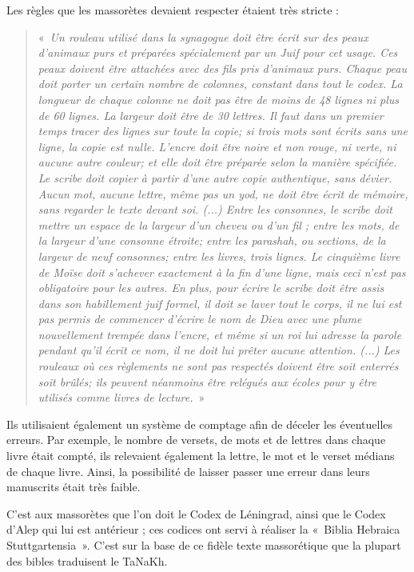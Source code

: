 \begin{small}
Les règles que les massorètes devaient respecter étaient très stricte :

\begin{quote}
«~\emph{Un rouleau utilisé dans la synagogue doit être écrit sur des peaux d’animaux purs et préparées spécialement par un Juif pour cet usage. Ces peaux doivent être attachées avec des fils pris d’animaux purs. Chaque peau doit porter un certain nombre de colonnes, constant dans tout le codex. La longueur de chaque colonne ne doit pas être de moins de 48 lignes ni plus de 60 lignes. La largeur doit être de 30 lettres. Il faut dans un premier temps tracer des lignes sur toute la copie; si trois mots sont écrits sans une ligne, la copie est nulle. L’encre doit être noire et non rouge, ni verte, ni aucune autre couleur; et elle doit être préparée selon la manière spécifiée. Le scribe doit copier à partir d’une autre copie authentique, sans dévier. Aucun mot, aucune lettre, même pas un yod, ne doit être écrit de mémoire, sans regarder le texte devant soi. (...) Entre les consonnes, le scribe doit mettre un espace de la largeur d’un cheveu ou d’un fil ; entre les mots, de la largeur d’une consonne étroite; entre les parashah, ou sections, de la largeur de neuf consonnes; entre les livres, trois lignes. Le cinquième livre de Moïse doit s’achever exactement à la fin d’une ligne, mais ceci n’est pas obligatoire pour les autres. En plus, pour écrire le scribe doit être assis dans son habillement juif formel, il doit se laver tout le corps, il ne lui est pas permis de commencer d’écrire le nom de Dieu avec une plume nouvellement trempée dans l’encre, et même si un roi lui adresse la parole pendant qu’il écrit ce nom, il ne doit lui prêter aucune attention. (...) Les rouleaux où ces règlements ne sont pas respectés doivent être soit enterrés soit brûlés; ils peuvent néanmoins être relégués aux écoles pour y être utilisés comme livres de lecture.}~»
\end{quote}

Ils utilisaient également un système de comptage afin de déceler les éventuelles erreurs. Par exemple, le nombre de versets, de mots et de lettres dans chaque livre était compté, ils relevaient également la lettre, le mot et le verset médians de chaque livre. Ainsi, la possibilité de laisser passer une erreur dans leurs manuscrits était très faible.\bigskip

C'est aux massorètes que l'on doit le Codex de Léningrad, ainsi que le Codex d'Alep qui lui est antérieur ; ces codices ont servi à réaliser la «~Biblia Hebraica Stuttgartensia~». C'est sur la base de ce fidèle texte massorétique que la plupart des bibles traduisent le TaNaKh.


\end{small}
